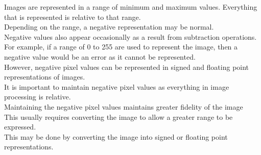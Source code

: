 Images are represented in a range of minimum and maximum values. Everything that is represented is relative to that range.\\
Depending on the range, a negative representation may be normal.\\
Negative values also appear occasionally as a result from subtraction operations.\\
For example, if a range of 0 to 255 are used to represent the image, then a negative value would be an error as it cannot be represented.\\
However, negative pixel values can be represented in signed and floating point representations of images.\\
It is important to maintain negative pixel values as everything in image processing is relative.\\
Maintaining the negative pixel values maintains greater fidelity of the image\\
This usually requires converting the image to allow a greater range to be expressed.\\
This may be done by converting the image into signed or floating point representations.\\

